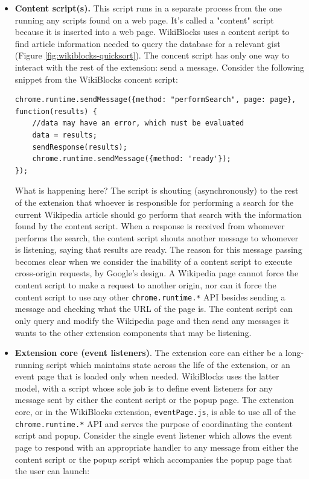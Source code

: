 \documentclass[a4paper, 11pt]{article} %
\begin{document}
\begin{itemize}
\item \textbf{Content script(s).} This script runs in a separate process from the one running any scripts found on a web page. It's called a "content" script because it is inserted into a web page. WikiBlocks uses a content script to find article information needed to query the database for a relevant gist (Figure \ref{fig:wikiblocks-quicksort}). The concent script has only one way to interact with the rest of the extension: send a message. Consider the following snippet from the WikiBlocks concent script:
	
\eject
	
\begin{lstlisting}
chrome.runtime.sendMessage({method: "performSearch", page: page}, function(results) {
	//data may have an error, which must be evaluated
	data = results;
	sendResponse(results);
	chrome.runtime.sendMessage({method: 'ready'});
});
\end{lstlisting}	

What is happening here? The script is shouting (asynchronously) to the rest of the extension that whoever is responsible for performing a search for the current Wikipedia article should go perform that search with the information found by the content script. When a response is received from whomever performs the search, the content script shouts another message to whomever is listening, saying that results are ready. The reason for this message passing becomes clear when we consider the inability of a content script to execute cross-origin requests, by Google's design. A Wikipedia page cannot force the content script to make a request to another origin, nor can it force the content script to use any other \texttt{chrome.runtime.*} API besides sending a message and checking what the URL of the page is. The content script can only query and modify the Wikipedia page and then send any messages it wants to the other extension components that may be listening.

\item \textbf{Extension core (event listeners)}. The extension core can either be a long-running script which maintains state across the life of the extension, or an event page that is loaded only when needed. WikiBlocks uses the latter model, with a script whose sole job is to define event listeners for any message sent by either the content script or the popup page. The extension core, or in the WikiBlocks extension, \texttt{eventPage.js}, is able to use all of the \texttt{chrome.runtime.*} API and serves the purpose of coordinating the content script and popup. Consider the single event listener which allows the event page to respond with an appropriate handler to any message from either the content script or the popup script which accompanies the popup page that the user can launch:


\end{itemize}
\end{document}
